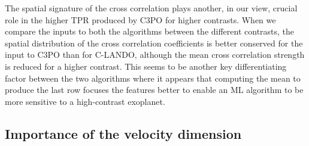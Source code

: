 \documentclass{aa}
\newcommand{\newchange}[1]{\textcolor{darkgreen}{#1}}
\begin{document}
The spatial signature of the cross correlation plays another, in our view, crucial role in the higher TPR produced by C3PO for higher contrasts.
When we compare the inputs to both the algorithms between the different contrasts, the spatial distribution of the cross correlation coefficients is better conserved for the input to C3PO than for C-LANDO, although the mean cross correlation strength is reduced for a higher contrast.
This seems to be another key differentiating factor between the two algorithms where it appears that computing the mean to produce the last row focuses the features better to enable an ML algorithm to be more sensitive to a high-contrast exoplanet.

\subsection{Importance of the velocity dimension}
\end{document}
